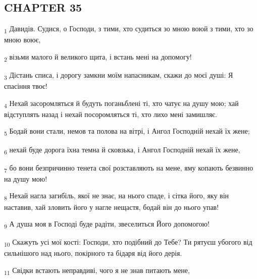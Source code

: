 \subsection{CHAPTER 35}
\begin{tcolorbox}
\textsubscript{1} Давидів. Судися, о Господи, з тими, хто судиться зо мною воюй з тими, хто зо мною воює,
\end{tcolorbox}
\begin{tcolorbox}
\textsubscript{2} візьми малого й великого щита, і встань мені на допомогу!
\end{tcolorbox}
\begin{tcolorbox}
\textsubscript{3} Дістань списа, і дорогу замкни моїм напасникам, скажи до моєї душі: Я спасіння твоє!
\end{tcolorbox}
\begin{tcolorbox}
\textsubscript{4} Нехай засоромляться й будуть поганьблені ті, хто чатує на душу мою; хай відступлять назад і нехай посоромляться ті, хто лихо мені замишляє.
\end{tcolorbox}
\begin{tcolorbox}
\textsubscript{5} Бодай вони стали, немов та полова на вітрі, і Ангол Господній нехай їх жене;
\end{tcolorbox}
\begin{tcolorbox}
\textsubscript{6} нехай буде дорога їхна темна й сковзька, і Ангол Господній нехай їх жене,
\end{tcolorbox}
\begin{tcolorbox}
\textsubscript{7} бо вони безпричинно тенета свої розставляють на мене, яму копають безвинно на душу мою!
\end{tcolorbox}
\begin{tcolorbox}
\textsubscript{8} Нехай нагла загибіль, якої не знає, на нього спаде, і сітка його, яку він наставив, хай зловить його у нагле нещастя, бодай він до нього упав!
\end{tcolorbox}
\begin{tcolorbox}
\textsubscript{9} А душа моя в Господі буде радіти, звеселиться Його допомогою!
\end{tcolorbox}
\begin{tcolorbox}
\textsubscript{10} Скажуть усі мої кості: Господи, хто подібний до Тебе? Ти рятуєш убогого від сильнішого над нього, покірного та бідаря від його дерія.
\end{tcolorbox}
\begin{tcolorbox}
\textsubscript{11} Свідки встають неправдиві, чого я не знав питають мене,
\end{tcolorbox}
